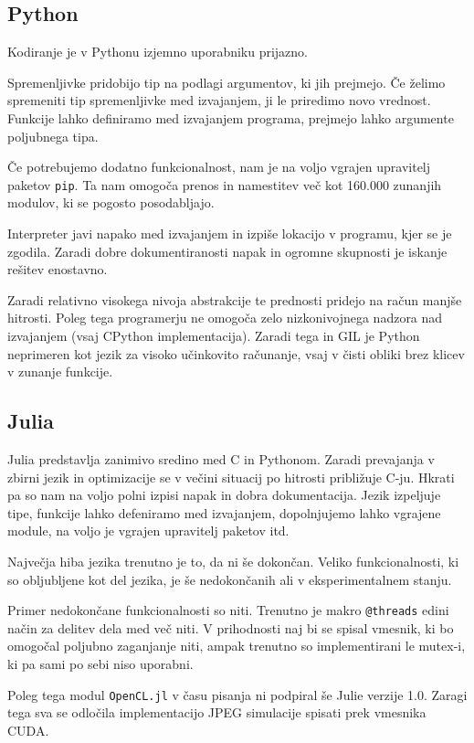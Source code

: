 \documentclass[journal,a4paper,twoside]{sty/IEEEtran}
\begin{document}
\subsection{Python}

Kodiranje je v Pythonu izjemno uporabniku prijazno.

Spremenljivke pridobijo tip na podlagi argumentov, ki jih prejmejo.
Če želimo spremeniti tip spremenljivke med izvajanjem, ji le priredimo novo vrednost.
Funkcije lahko definiramo med izvajanjem programa, prejmejo lahko argumente poljubnega tipa.

Če potrebujemo dodatno funkcionalnost, nam je na voljo vgrajen upravitelj paketov \texttt{pip}.
Ta nam omogoča prenos in namestitev več kot 160.000 zunanjih modulov, ki se pogosto posodabljajo.

Interpreter javi napako med izvajanjem in izpiše lokacijo v programu, kjer se je zgodila.
Zaradi dobre dokumentiranosti napak in ogromne skupnosti je iskanje rešitev enostavno.

Zaradi relativno visokega nivoja abstrakcije te prednosti pridejo na račun manjše hitrosti.
Poleg tega programerju ne omogoča zelo nizkonivojnega nadzora nad izvajanjem (vsaj CPython implementacija).
Zaradi tega in GIL je Python neprimeren kot jezik za visoko učinkovito računanje, vsaj v čisti obliki brez klicev v zunanje funkcije.

\subsection{Julia}

Julia predstavlja zanimivo sredino med C in Pythonom.
Zaradi prevajanja v zbirni jezik in optimizacije se v večini situacij po hitrosti približuje C-ju.
Hkrati pa so nam na voljo polni izpisi napak in dobra dokumentacija.
Jezik izpeljuje tipe, funkcije lahko defeniramo med izvajanjem, dopolnjujemo lahko vgrajene module, na voljo je vgrajen upravitelj paketov itd.

Največja hiba jezika trenutno je to, da ni še dokončan.
Veliko funkcionalnosti, ki so obljubljene kot del jezika, je še nedokončanih ali v eksperimentalnem stanju.

Primer nedokončane funkcionalnosti so niti.
Trenutno je makro \texttt{@threads} edini način za delitev dela med več niti.
V prihodnosti naj bi se spisal vmesnik, ki bo omogočal poljubno zaganjanje niti, ampak trenutno so implementirani le mutex-i, ki pa sami po sebi niso
	uporabni.

Poleg tega modul \texttt{OpenCL.jl} v času pisanja ni podpiral še Julie verzije 1.0.
Zaragi tega sva se odločila implementacijo JPEG simulacije spisati prek vmesnika CUDA.
\end{document}
